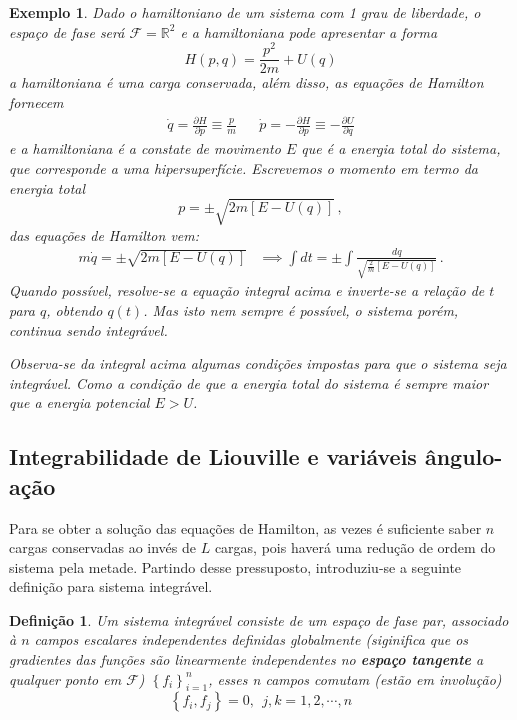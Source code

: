 \documentclass[25pt]{article}
\numberwithin{equation}{subsection} %
\newtheorem{defi}{Definição}
\newtheorem{expl}{Exemplo}
\newcommand{\poisson}[2]{\left\{#1,#2\right\}}
\begin{document}
\bigbreak
\begin{expl}
	Dado o hamiltoniano de um sistema com 1 grau de liberdade, o espaço de fase será $\mathcal{F}=\mathbb{R}^2$ e a hamiltoniana pode apresentar a forma
	\begin{displaymath}
	H(p,q)=\frac{p^2}{2m}+U(q)
	\end{displaymath}
	a hamiltoniana é uma carga conservada, além disso, as equações de Hamilton fornecem
	\begin{align}
	\dot{q}=\frac{\partial H}{\partial p}\equiv \frac{p}{m}&&\dot{p}=-\frac{\partial H}{\partial p}\equiv-\frac{\partial U}{\partial q}
	\end{align}
	e a hamiltoniana é a constate de movimento $E$ que é a energia total do sistema, que corresponde a uma hipersuperfície. Escrevemos o momento em termo da energia total
	\begin{equation}
	p=\pm\sqrt{2m\left[E-U(q)\right]}\,,
	\end{equation}
	das equações de Hamilton vem:
	\begin{align}
	m\dot{q}=\pm\sqrt{2m\left[E-U(q)\right]}&\implies\int dt=\pm\int \frac{dq}{\sqrt{\frac{2}{m}\left[E-U(q)\right]}}\,.
	\end{align}
	Quando possível, resolve-se a equação integral acima e inverte-se a relação de $t$ para $q$, obtendo $q(t)$. Mas isto nem sempre é possível, o sistema porém, continua sendo integrável.
	
	Observa-se da integral acima algumas condições impostas para que o sistema seja integrável. Como a condição de que a energia total do sistema é sempre maior que a energia potencial $E>U$.
\end{expl}
\subsection{Integrabilidade de Liouville e variáveis ângulo-ação}
Para se obter a solução das equações de Hamilton, as vezes é suficiente saber $n$ cargas conservadas ao invés de $L$ cargas, pois haverá uma redução de ordem do sistema pela metade. Partindo desse pressuposto, introduziu-se a seguinte definição para sistema integrável.
\begin{defi}
	Um sistema integrável consiste de um espaço de fase par, associado à $n$ campos escalares independentes definidas globalmente (siginifica que os gradientes das funções são linearmente independentes no \textbf{espaço tangente} a qualquer ponto em $\mathcal{F}$) $\left\{f_i\right\}_{i=1}^{n}$, esses n campos comutam (estão em involução) $$\poisson{f_i}{f_j}=0,~~j,k=1,2,\cdots,n$$
\end{defi}
\end{document}
